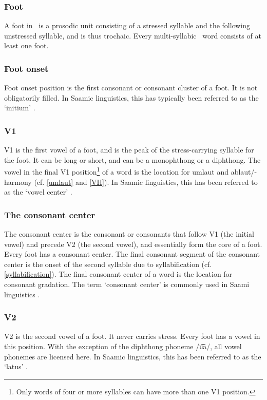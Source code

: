 \subsubsection{Foot}\label{foot}
A {foot} in \PS\ is a prosodic unit consisting of a stressed syllable and the following unstressed syllable, and is thus trochaic. Every multi-syllabic \PS\ word consists of at least one foot. 

\subsubsection{Foot onset}\label{footOnset}
{Foot onset} position is the first consonant or consonant cluster of a foot. It is not obligatorily filled. 
In Saamic linguistics, this has typically been referred to as the ‘initium’ \citep[cf.][39]{Sammallahti1998}.

\subsubsection{V1}\label{v1}
{V1} is the first vowel of a foot, and is the peak of the stress-carrying syllable for the foot. It can be long or short, and can be a monophthong or a diphthong. The vowel in the final V1 position\footnote{Only words of four or more syllables can have more than one V1 position.}
 of a word is the location for umlaut and ablaut/-harmony (cf. \SEC\ref{umlaut} and \SEC\ref{VH}). 
In Saamic linguistics, this has been referred to as the ‘vowel center’ \citep[cf.][39]{Sammallahti1998}.

\subsubsection{The consonant center}\label{CCent}
The {consonant center} is the consonant or consonants that follow V1 (the initial vowel) and precede V2 (the second vowel), and essentially form the core 
of a foot. Every foot has a consonant center. The final consonant segment of the consonant center is the onset of the second syllable due to syllabification (cf. \SEC\ref{syllabification}). The final consonant center of a word is the location for consonant gradation. The term ‘consonant center’ is commonly used in Saami linguistics \citep[cf.][39]{Sammallahti1998}. 

\subsubsection{V2}\label{v2}
{V2} is the second vowel of a foot. It never carries stress. Every foot has a vowel in this position. With the exception of the diphthong phoneme /u͡a/, all vowel phonemes are licensed here. 
In Saamic linguistics, this has been referred to as the ‘latus’ \citep[cf.][39]{Sammallahti1998}.

